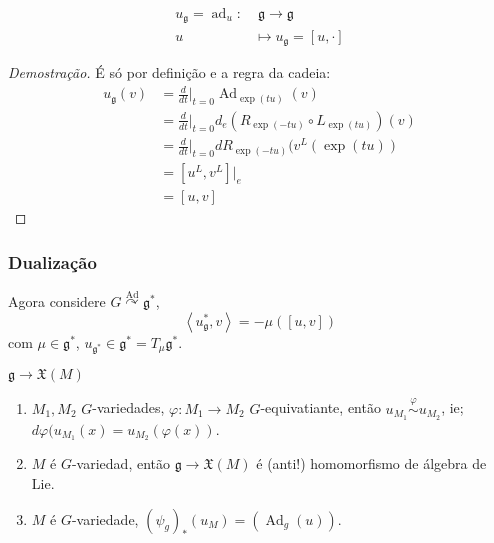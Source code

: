 \begin{example}
\begin{lemma}
	 \begin{align*}
		u_\mathfrak{g} =\operatorname{ad}_u :&\;\mathfrak{g}\longrightarrow \mathfrak{g} \\
		u &\longmapsto u_\mathfrak{g} =[u,\cdot ]
	\end{align*}
\end{lemma}

\begin{proof}[Demostração]
	É só por definição e a regra da cadeia:
	\begin{align*}
		u_{\mathfrak{g}}(v)&=\frac{d}{dt}\Big|_{t=0}\operatorname{Ad}_{\operatorname{exp}(tu)}(v)\\
				   &=\frac{d}{dt}\Big|_{t=0}d_e(R_{\operatorname{exp}(-tu)}\circ  L_{\operatorname{exp}(tu)})(v)\\
		&=\frac{d}{dt}\Big|_{t=0}dR_{\operatorname{exp}(-tu)}(v^L(\operatorname{exp}(tu))\\
		&=[u^L,v^L]|_{e}\\
		&=[u,v]
	\end{align*}
\end{proof}
\end{example}

\subsubsection{Dualização}
Agora considere $G\overset{\operatorname{Ad}}{\curvearrowright }\mathfrak{g}^*$,
\[\left<u_{\mathfrak{g}}^*,v\right> =-\mu\left( [u,v] \right) \]
com $\mu\in\mathfrak{g}^*$, $u_{\mathfrak{g}^*}\in\mathfrak{g}^*=T_\mu\mathfrak{g}^*$.

\begin{question}
	$\mathfrak{g} \to \mathfrak{X}(M)$
\end{question}

\begin{prop}\leavevmode 
	\begin{enumerate}
		\item $M_1,M_2$ $G$-variedades, $ \varphi:M_1\to M_2$ $G$-equivatiante, então $u_{M_1}\overset{\varphi}{\sim}u_{M_2}$, ie; $d\varphi (u_{M_1}(x)=u_{M_2}(\varphi(x))$.

		\item $M$ é $G$-variedad, então $\mathfrak{g} \to \mathfrak{X}(M)$ é (anti!) homomorfismo de álgebra de Lie.

		\item $M$  é $G$-variedade, $(\psi_g)_*(u_M)=(\operatorname{Ad}_g(u))$.
	\end{enumerate}
\end{prop}

